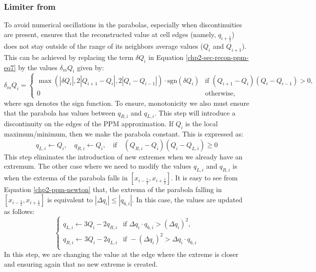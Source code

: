 \subsubsection{Limiter from \citet{colella:1984}}
To avoid numerical oscillations in the parabolas, especially when discontinuities are present,
\citet{colella:1984} ensures that the reconstructed value 
at cell edges (namely, $q_{i+\frac{1}{2}}$) does not stay outside of the range of its 
neighbors average values ($Q_{i}$ and $Q_{i+1}$).
This can be achieved by replacing the term $\delta Q_i$ in Equation \eqref{chp2-sec-recon-ppm-eq7}
by the values $\delta_m Q_i$ given by:
\begin{equation}
	\label{chp2-sec-mono-eq1}
	\delta_m Q_{i} =
	\begin{cases}
		\max(|\delta Q_i|,2|Q_{i+1}-Q_{i}|, 2|Q_{i}-Q_{i-1}|) \cdot \text{sgn}(\delta Q_i)& 
		\text{if } (Q_{i+1}-Q_{i})(Q_{i}-Q_{i-1}) > 0,\\
		0 & \text{otherwise,} 
	\end{cases}
\end{equation}
where $\text{sgn}$ denotes the sign function.
To ensure, monotonicity we also must ensure that the parabola has values between
$q_{R,i}$ and $q_{L,i}$.
This step will introduce a discontinuity on the edges of the PPM approximation.
If $Q_i$ is the local maximum/minimum, then we make the parabola constant. 
This is expressed as:
	\begin{equation}
		\label{chp2-sec-mono-eq2}
		q_{L,i} \leftarrow Q_i, \quad q_{R,i} \leftarrow Q_i, \quad \text{if} \quad (Q_{R,i}-Q_i)(Q_i-Q_{L,i}) \geq 0
	\end{equation}
	This step eliminates the introduction of new extremes when we already have an extremum.
The other case where we need to modify the values $q_{L,i}$ and $q_{R,i}$
is when the extrema of the parabola falls in $[x_{i-\frac{1}{2}},x_{i+\frac{1}{2}}]$.
It is easy to see from Equation \eqref{chp2-ppm-newton} that, the extrema of the parabola falling in 
$[x_{i-\frac{1}{2}},x_{i+\frac{1}{2}}]$ is equivalent to $|\Delta q_i| \leq |q_{6,i}|$.
In this case, the values are updated as follows:
\begin{equation}
	\label{chp2-sec-mono-eq3}
	\begin{cases}
		q_{L,i} \leftarrow 3Q_i - 2q_{R,i}	& 
		\text{if } \Delta q_i \cdot q_{6,i} > (\Delta q_i)^2,\\
		q_{R,i} \leftarrow 3Q_i - 2q_{L,i}	& 
		\text{if } -(\Delta q_i)^2 > \Delta q_i\cdot q_{6,i} \\
	\end{cases}
\end{equation}
In this step, we are changing the value at the edge where the extreme is closer and ensuring
again that no new extreme is created.

